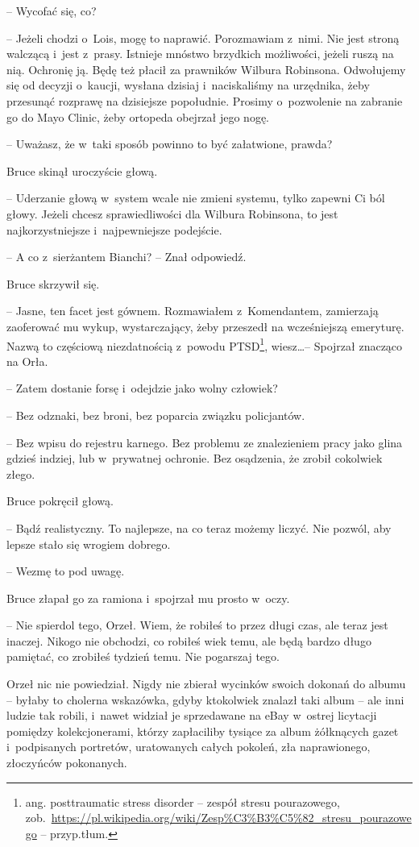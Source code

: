 \documentclass[oneside,polish,11pt,sfheadings]{mwbk}
\begin{document}
-- Wycofać się, co?

-- Jeżeli chodzi o~Lois, mogę to naprawić. Porozmawiam z~nimi. Nie jest
stroną walczącą i~jest z~prasy. Istnieje mnóstwo brzydkich możliwości,
jeżeli ruszą na nią. Ochronię ją. Będę też płacił za prawników Wilbura
Robinsona. Odwołujemy się od decyzji o~kaucji, wysłana dzisiaj i~naciskaliśmy na urzędnika, żeby przesunąć rozprawę na dzisiejsze
popołudnie. Prosimy o~pozwolenie na zabranie go do Mayo Clinic, żeby
ortopeda obejrzał jego nogę.

-- Uważasz, że w~taki sposób powinno to być załatwione, prawda?

Bruce skinął uroczyście głową. 

-- Uderzanie głową w~system wcale nie
zmieni systemu, tylko zapewni Ci ból głowy. Jeżeli chcesz
sprawiedliwości dla Wilbura Robinsona, to jest najkorzystniejsze i~najpewniejsze podejście.

-- A co z~sierżantem Bianchi? -- Znał odpowiedź.

Bruce skrzywił się. 

-- Jasne, ten facet jest gównem. Rozmawiałem z~Komendantem, zamierzają zaoferować mu wykup, wystarczający, żeby
przeszedł na wcześniejszą emeryturę. Nazwą to częściową niezdatnością z~powodu PTSD\footnote{ ang. posttraumatic stress disorder -- zespół stresu
pourazowego,
zob.~\url{https://pl.wikipedia.org/wiki/Zesp\%C3\%B3\%C5\%82\_stresu\_pourazowego}
-- przyp.tłum.}, wiesz\ldots  -- Spojrzał znacząco na Orła.

-- Zatem dostanie forsę i~odejdzie jako wolny człowiek?

-- Bez odznaki, bez broni, bez poparcia związku policjantów.

-- Bez wpisu do rejestru karnego. Bez problemu ze znalezieniem pracy jako
glina gdzieś indziej, lub w~prywatnej ochronie. Bez osądzenia, że zrobił
cokolwiek złego.

Bruce pokręcił głową. 

-- Bądź realistyczny. To najlepsze, na co teraz
możemy liczyć. Nie pozwól, aby lepsze stało się wrogiem dobrego.

-- Wezmę to pod uwagę.

Bruce złapał go za ramiona i~spojrzał mu prosto w~oczy. 

-- Nie spierdol
tego, Orzeł. Wiem, że robiłeś to przez długi czas, ale teraz jest
inaczej. Nikogo nie obchodzi, co robiłeś wiek temu, ale będą bardzo
długo pamiętać, co zrobiłeś tydzień temu. Nie pogarszaj tego.

Orzeł nic nie powiedział. Nigdy nie zbierał wycinków swoich dokonań do
albumu -- byłaby to cholerna wskazówka, gdyby ktokolwiek znalazł taki
album -- ale inni ludzie tak robili, i~nawet widział je sprzedawane na
eBay w~ostrej licytacji pomiędzy kolekcjonerami, którzy zapłaciliby
tysiące za album żółknących gazet i~podpisanych portretów, uratowanych
całych pokoleń, zła naprawionego, złoczyńców pokonanych.
\end{document}
